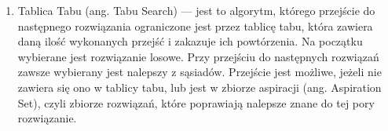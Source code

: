 \begin{enumerate}
\item Tablica Tabu (ang. Tabu Search) --- jest to algorytm, którego przejście do
następnego rozwiązania ograniczone jest przez tablicę tabu, która zawiera daną
ilość wykonanych przejść i zakazuje ich powtórzenia. Na początku wybierane jest
rozwiązanie losowe. Przy przejściu do następnych rozwiązań zawsze wybierany jest
nalepszy z sąsiadów.
Przejście jest możliwe, jeżeli nie zawiera się ono w tablicy tabu, lub jest w 
zbiorze aspiracji (ang. Aspiration Set), czyli zbiorze rozwiązań, 
które poprawiają nalepsze znane do tej pory rozwiązanie.

\end{enumerate}

